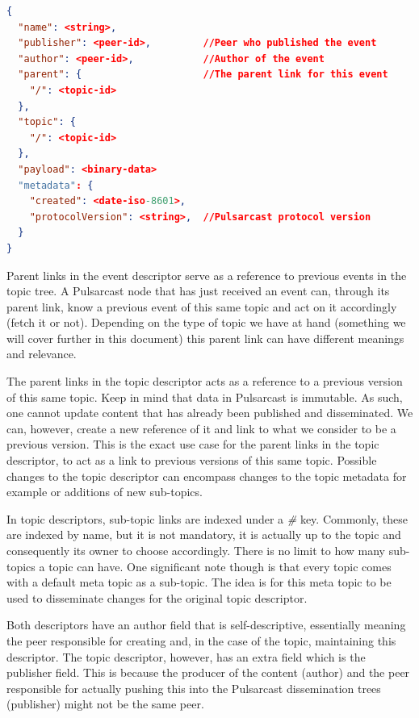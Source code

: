 \begin{lstlisting}[float, language=JSON,caption={Event descriptor schema in a JSON based format},label={event-descriptor}]
{
  "name": <string>,
  "publisher": <peer-id>,         //Peer who published the event
  "author": <peer-id>,            //Author of the event
  "parent": {                     //The parent link for this event
    "/": <topic-id>
  },
  "topic": {
    "/": <topic-id>
  },
  "payload": <binary-data>
  "metadata": {
    "created": <date-iso-8601>,
    "protocolVersion": <string>,  //Pulsarcast protocol version
  }
}
\end{lstlisting}


Parent links in the event descriptor serve as a reference to previous events in
the topic tree. A Pulsarcast node that has just received an event can, through
its parent link, know a previous event of this same topic and act on it
accordingly (fetch it or not). Depending on the type of topic we have at hand
(something we will cover further in this document) this parent link can have
different meanings and relevance.

The parent links in the topic descriptor acts as a reference to a previous
version of this same topic. Keep in mind that data in Pulsarcast is immutable.
As such, one cannot update content that has already been published and
disseminated. We can, however, create a new reference of it and link to what we
consider to be a previous version. This is the exact use case for the parent
links in the topic descriptor, to act as a link to previous versions of this
same topic. Possible changes to the topic descriptor can encompass changes to
the topic metadata for example or additions of new sub-topics.

In topic descriptors, sub-topic links are indexed under a \emph{\#} key.
Commonly, these are indexed by name, but it is not mandatory, it is actually up
to the topic and consequently its owner to choose accordingly.  There is no
limit to how many sub-topics a topic can have. One significant note though is
that every topic comes with a default meta topic as a sub-topic. The idea is
for this meta topic to be used to disseminate changes for the original topic
descriptor.

Both descriptors have an author field that is self-descriptive, essentially
meaning the peer responsible for creating and, in the case of the topic,
maintaining this descriptor. The topic descriptor, however, has an extra field
which is the publisher field. This is because the producer of the content
(author) and the peer responsible for actually pushing this into the Pulsarcast
dissemination trees (publisher) might not be the same peer.

